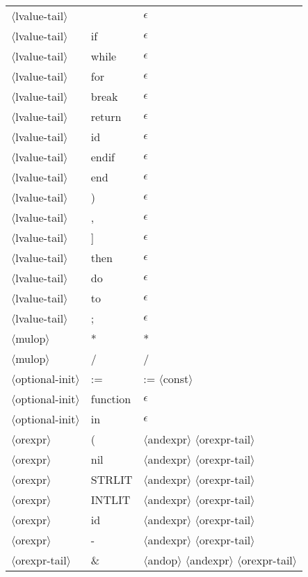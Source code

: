 \documentclass[11pt, fleqn]{article}
\newcommand{\atag}[1]{$\langle$#1$\rangle$}
\begin{document}
\begin{longtable}{l|l|l}
\atag{lvalue-tail}				&	\textbar		&	$\epsilon$											\\
\atag{lvalue-tail}				&	if		&		$\epsilon$										\\
\atag{lvalue-tail}				&	while		&		$\epsilon$										\\
\atag{lvalue-tail}				&	for		&		$\epsilon$										\\
\atag{lvalue-tail}				&	break		&	$\epsilon$											\\
\atag{lvalue-tail}				&	return		&	$\epsilon$											\\
\atag{lvalue-tail}				&	id		&		$\epsilon$										\\
\atag{lvalue-tail}				&	endif		&	$\epsilon$											\\
\atag{lvalue-tail}				&	end		&		$\epsilon$										\\
\atag{lvalue-tail}				&	)		&	$\epsilon$											\\
\atag{lvalue-tail}				&	,		&	$\epsilon$											\\
\atag{lvalue-tail}				&	]		&	$\epsilon$											\\
\atag{lvalue-tail}				&	then		&	$\epsilon$											\\
\atag{lvalue-tail}				&	do		&	$\epsilon$											\\
\atag{lvalue-tail}				&	to		&	$\epsilon$											\\
\atag{lvalue-tail}				&	;		&	$\epsilon$											\\
\atag{mulop}						&	*		&	*													\\
\atag{mulop}						&	/		&	/													\\
\atag{optional-init}				&	:=		&	:= \atag{const}	\\
\atag{optional-init}				&	function		& $\epsilon$		\\
\atag{optional-init}				&	in		& $\epsilon$		\\
\atag{orexpr} 					&	(			&	\atag{andexpr} \atag{orexpr-tail}	\\
\atag{orexpr} 					&	nil			&	\atag{andexpr} \atag{orexpr-tail}	\\
\atag{orexpr} 					&	STRLIT			&	\atag{andexpr} \atag{orexpr-tail}	\\
\atag{orexpr} 					&	INTLIT			&	\atag{andexpr} \atag{orexpr-tail}	\\
\atag{orexpr} 					&	id			&\atag{andexpr} \atag{orexpr-tail}		\\
\atag{orexpr} 					&	-			&	\atag{andexpr} \atag{orexpr-tail}	\\
\atag{orexpr-tail}				&	\& 		&	\atag{andop} \atag{andexpr} \atag{orexpr-tail}	\\

\end{longtable}
\end{document}
